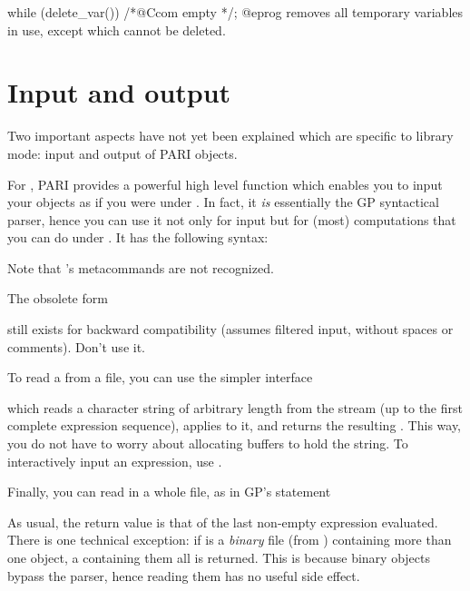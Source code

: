 \bprog
  while (delete_var()) /*@Ccom empty */;
@eprog\noindent
removes all temporary variables in use, except  which cannot be
deleted.

\section{Input and output}

\noindent
Two important aspects have not yet been explained which are specific to
library mode: input and output of PARI objects.


\noindent
For , PARI provides a powerful high level function
which enables you to input your objects as if you were under . In fact,
it \emph{is} essentially the GP syntactical parser, hence you can use it not
only for input but for (most) computations that you can do under .
It has the following syntax:\label{se:gp_read_str}


\noindent
Note that 's metacommands are not recognized.

 The obsolete form


still exists for backward compatibility (assumes filtered input, without
spaces or comments). Don't use it.

To read a  from a file, you can use the simpler interface


\noindent which reads a character string of arbitrary length from the stream
 (up to the first complete expression sequence), applies
 to it, and returns the resulting . This way, you
do not have to worry about allocating buffers to hold the string. To
interactively input an expression, use .

Finally, you can read in a whole file, as in GP's  statement


\noindent As usual, the return value is that of the last non-empty expression
evaluated. There is one technical exception: if  is a \emph{binary}
file (from ) containing more than one object, a 
containing them all is returned. This is because binary objects bypass the
parser, hence reading them has no useful side effect.

